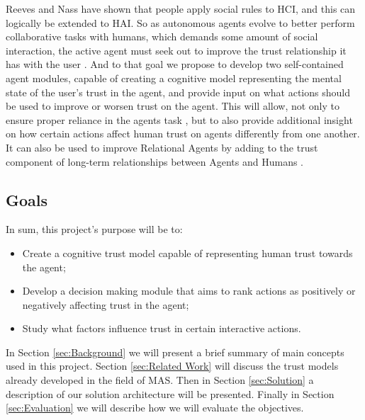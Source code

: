 Reeves and Nass have shown that people apply social rules to \ac{HCI}, and this can logically be extended to \ac{HAI}\cite{Reeves1998a}. So as autonomous agents evolve to better perform collaborative tasks with humans, which demands some amount of social interaction, the active agent must seek out to improve the trust relationship it has with the user \cite{Lashkari1994}. And to that goal we propose to develop two self-contained agent modules, capable of creating a cognitive model representing the mental state of the user's trust in the agent, and provide input on what actions should be used to improve or worsen trust on the agent. This will allow, not only to ensure proper reliance in the agents task \cite{Lee2004}, but to also provide additional insight on how certain actions affect human trust on agents differently from one another. It can also be used to improve Relational Agents by adding to the trust component of long-term relationships between Agents and Humans \cite{Bickmore2001b}.


\subsection{Goals}
\label{subsec:Goals}

In sum, this project's purpose will be to:
\begin{itemize}
	\item Create a cognitive trust model capable of representing human trust towards the agent;
	\item Develop a decision making module that aims to rank actions as positively or negatively affecting trust in the agent;
	\item Study what factors influence trust in certain interactive actions.
\end{itemize}


In Section \ref{sec:Background} we will present a brief summary of main concepts used in this project. Section \ref{sec:Related Work} will discuss the trust models already developed in the field of \ac{MAS}. Then in Section \ref{sec:Solution} a description of our solution architecture will be presented. Finally in Section \ref{sec:Evaluation} we will describe how we will evaluate the objectives.


